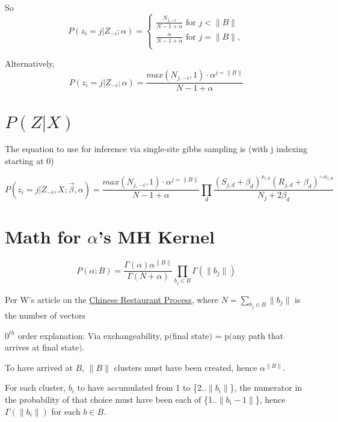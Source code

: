 \documentclass{article}
\begin{document}
So
\begin{equation}
P(z_i=j|Z_{-i};\alpha) = 
\begin{cases}
  \frac{N_{j,-i}}{N-1+\alpha} \text{ for $j < \|B\|$} \\
  \frac{\alpha}{N-1+\alpha}  \text{ for $j = \|B\|$},\\
\end{cases}
\end{equation}

Alternatively,
\begin{equation}
P(z_i=j|Z_{-i};\alpha) = \frac{max(N_{j,-i},1) \cdot \alpha^{j=\|B\|}}{N-1+\alpha}
\end{equation}

\section{$P(Z|X)$}

The equation to use for inference via single-site gibbs sampling is (with j indexing starting at 0)

\begin{equation}
P( z_i=j | Z_{-i},X ; \vec \beta, \alpha) = 
  \frac{max(N_{j,-i},1) \cdot \alpha^{j=\|B\|}}{N-1+\alpha} \prod_d \frac{(S_{j,d} + \beta_d)^{x_{i,d}}(R_{j,d} + \beta_d)^{\sim x_{i,d}}}{N_j + 2 \beta_d} 
\end{equation}

\section{Math for $\alpha$'s MH Kernel}

\begin{equation}
P(\alpha;B) = \frac{\Gamma(\alpha)\alpha^{\|B\|}}{\Gamma(N+\alpha)} \prod_{b_j \in B} \Gamma(\|b_j\|)
\end{equation}

Per W's article on the \href{https://en.wikipedia.org/wiki/Chinese_restaurant_process}{Chinese Restaurant Process}, where $N = \sum_{b_j \in B} \|b_j\|$ is the number of vectors
\newline

$0^{th}$ order explanation: Via exchangeability, p$($final state$)$ = p$($any path that arrives at final state$)$.  

To have arrived at $B$, $\|B\|$ clusters must have been created, hence $\alpha^{\|B\|}$.

For each cluster, $b_i$ to have accumulated from 1 to \{2..$\|b_i\|$\}, the numerator in the probability of that choice must have been each of \{1..$\|b_i-1\|$\}, hence $\Gamma(\|b_i\|)$ for each $b \in B$.
\end{document}
